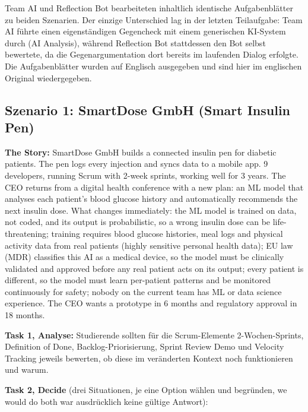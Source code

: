 Team AI und Reflection Bot bearbeiteten inhaltlich identische Aufgabenblätter zu beiden Szenarien.
Der einzige Unterschied lag in der letzten Teilaufgabe: Team AI führte einen eigenständigen
Gegencheck mit einem generischen KI-System durch (\glqq AI Analysis\grqq{}), während Reflection Bot
stattdessen den Bot selbst bewertete, da die Gegenargumentation dort bereits im laufenden Dialog
erfolgte. Die Aufgabenblätter wurden auf Englisch ausgegeben und sind hier im englischen Original
wiedergegeben.

\subsection*{Szenario 1: SmartDose GmbH (Smart Insulin Pen)}

\textbf{The Story:} SmartDose GmbH builds a connected insulin pen for diabetic patients. The pen
logs every injection and syncs data to a mobile app. 9 developers, running Scrum with 2-week
sprints, working well for 3 years. The CEO returns from a digital health conference with a new
plan: an ML model that analyses each patient's blood glucose history and automatically recommends
the next insulin dose. What changes immediately: the ML model is trained on data, not coded, and
its output is probabilistic, so a wrong insulin dose can be life-threatening; training requires
blood glucose histories, meal logs and physical activity data from real patients (highly sensitive
personal health data); EU law (MDR) classifies this AI as a medical device, so the model must be
clinically validated and approved before any real patient acts on its output; every patient is
different, so the model must learn per-patient patterns and be monitored continuously for safety;
nobody on the current team has ML or data science experience. The CEO wants a prototype in 6 months
and regulatory approval in 18 months.

\textbf{Task 1, Analyse:} Studierende sollten für die Scrum-Elemente 2-Wochen-Sprints, Definition
of Done, Backlog-Priorisierung, Sprint Review Demo und Velocity Tracking jeweils bewerten, ob diese
im veränderten Kontext noch funktionieren und warum.

\textbf{Task 2, Decide} (drei Situationen, je eine Option wählen und begründen, \glqq we would do
both\grqq{} war ausdrücklich keine gültige Antwort):

